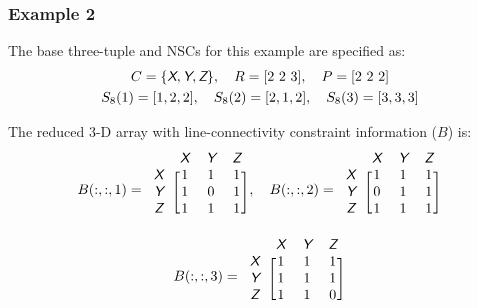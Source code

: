 \subsubsection{Example 2\label{sec:app1:lines-ex2}}

The base three-tuple and NSCs for this example are specified as:
\begin{align}
\begin{gathered}
C = \{ \textsl{\textsf{X}}, \textsl{\textsf{Y}}, \textsl{\textsf{Z}} \}, \quad R = [2\ 2\ 3], \quad P = [2\ 2\ 2] \\
S_8(1) = [1,2,2], \quad S_8(2) = [2,1,2], \quad S_8(3) = [3,3,3]
\end{gathered}
\end{align}

\noindent The reduced 3-D array with line-connectivity constraint information ($B$) is:
\begin{align}
\begin{gathered}
B(:,:,1) =
\begin{blockarray}{cccc}
& \xcolor{X} & \xcolor{Y} & \xcolor{Z}  \\
\begin{block}{c[ccc]}
\xcolor{X} & 1 & 1 & 1 \\
\xcolor{Y} & 1 & 0 & 1 \\
\xcolor{Z} & 1 & 1 & 1 \\
\end{block}
\end{blockarray}, \quad
B(:,:,2) =
\begin{blockarray}{cccc}
& \xcolor{X} & \xcolor{Y} & \xcolor{Z}  \\
\begin{block}{c[ccc]}
\xcolor{X} & 1 & 1 & 1 \\
\xcolor{Y} & 0 & 1 & 1 \\
\xcolor{Z} & 1 & 1 & 1 \\
\end{block}
\end{blockarray} \\ 
B(:,:,3) =
\begin{blockarray}{cccc}
& \xcolor{X} & \xcolor{Y} & \xcolor{Z}  \\
\begin{block}{c[ccc]}
\xcolor{X} & 1 & 1 & 1 \\
\xcolor{Y} & 1 & 1 & 1 \\
\xcolor{Z} & 1 & 1 & 0 \\
\end{block}
\end{blockarray} 
\end{gathered}
\end{align}
\vspace{-2em}

